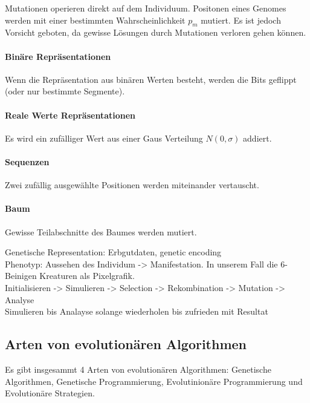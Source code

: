       Mutationen operieren direkt auf dem Individuum.
      Positonen eines Genomes werden mit einer bestimmten Wahrscheinlichkeit \(p_{m}\) mutiert.
      Es ist jedoch Vorsicht geboten, da gewisse Lösungen durch Mutationen verloren gehen können.

      \paragraph{Binäre Repräsentationen}

        Wenn die Repräsentation aus binären Werten besteht, werden die Bits geflippt (oder nur bestimmte Segmente).

      \paragraph{Reale Werte Repräsentationen}

        Es wird ein zufälliger Wert aus einer Gaus Verteilung \(N(0,\sigma)\) addiert.

      \paragraph{Sequenzen}

        Zwei zufällig ausgewählte Positionen werden miteinander vertauscht.

      \paragraph{Baum}

        Gewisse Teilabschnitte des Baumes werden mutiert.

    Genetische Representation: Erbgutdaten, genetic encoding
    \\
    Phenotyp: Aussehen des Individum -> Manifestation. In unserem Fall die 6-Beinigen Kreaturen als Pixelgrafik.
    \\
    Initialisieren -> Simulieren -> Selection -> Rekombination -> Mutation -> Analyse
    \\
    Simulieren bis Analayse solange wiederholen bis zufrieden mit Resultat

  \subsection{Arten von evolutionären Algorithmen\label{sub:artenEvAlgos}}

    Es gibt insgesammt 4 Arten von evolutionären Algorithmen:
    Genetische Algorithmen, Genetische Programmierung, Evolutinionäre Programmierung
    und Evolutionäre Strategien.

